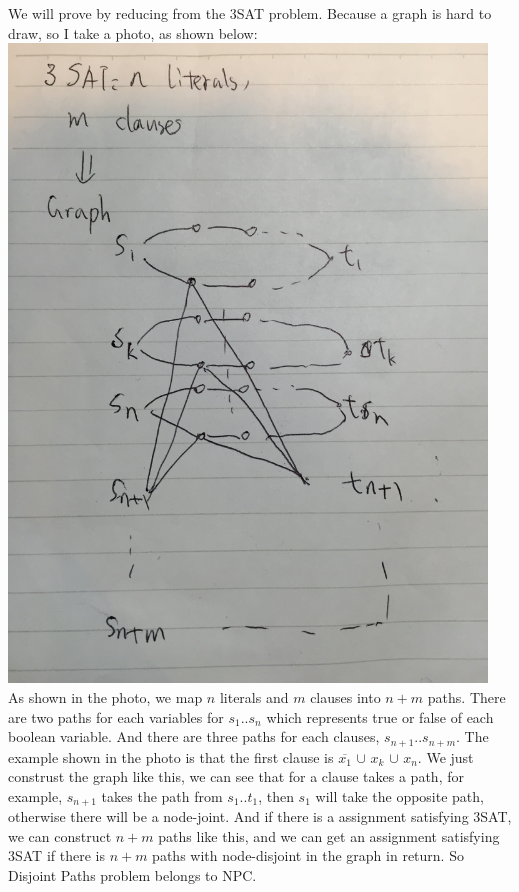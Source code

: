 \documentclass[11pt]{article}
\begin{document}
\part{}
    We will prove by reducing from the 3SAT problem. Because a graph is hard to draw, so I take a photo, as shown below: \\
    \includegraphics[width=5in]{part3}\\
    As shown in the photo, we map $n$ literals and $m$ clauses into $n+m$ paths. There are two paths for each variables for $s_{1}$..$s_{n}$ which represents true or false of each boolean variable. And there are three paths for each clauses, $s_{n+1}$..$s_{n+m}$. 
    The example shown in the photo is that the first clause is $\overline{x_{1}}$ $\cup$ $x_{k}$ $\cup$ $x_{n}$. We just construst the graph like this, we can see that for a clause takes a path, for example, $s_{n+1}$ takes the path from $s_{1}$..$t_{1}$, then $s_{1}$ will take the opposite path, otherwise there will be a node-joint. And if there is a assignment satisfying 3SAT, we can construct $n+m$ paths like this, and we can get an assignment satisfying 3SAT if there is $n+m$ paths with node-disjoint in the graph in return. So Disjoint Paths problem belongs to NPC.
\end{document}
